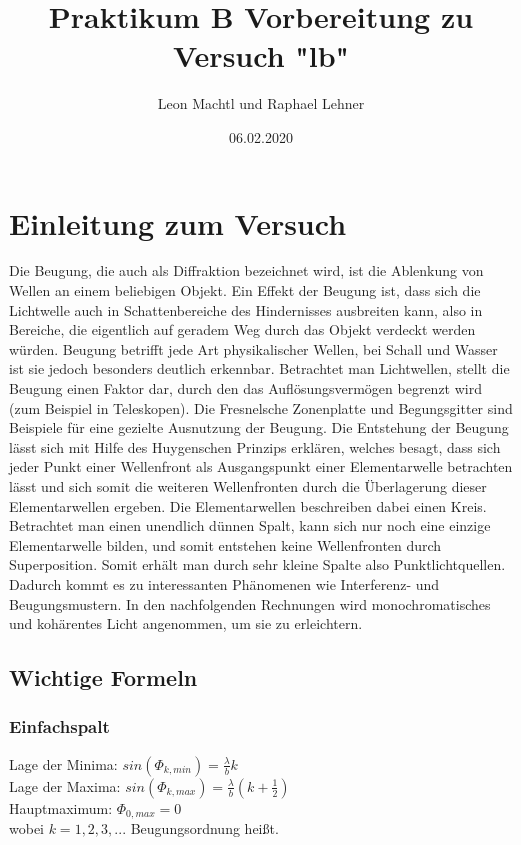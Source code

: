 \documentclass[a4paper,10pt]{scrartcl}
\title{Praktikum B Vorbereitung zu Versuch "lb"}
\author{Leon Machtl und Raphael Lehner}
\date{06.02.2020}
\begin{document}
	\maketitle
	\tableofcontents
	\newpage
	
	\section{Einleitung zum Versuch}
	
	Die Beugung, die auch als Diffraktion bezeichnet wird, ist die Ablenkung von Wellen an einem beliebigen Objekt. Ein Effekt der Beugung ist, dass sich die Lichtwelle auch in Schattenbereiche des Hindernisses ausbreiten kann, also in Bereiche, die eigentlich auf geradem Weg durch das Objekt verdeckt werden würden. Beugung betrifft jede Art physikalischer Wellen, bei Schall und Wasser ist sie jedoch besonders deutlich erkennbar. Betrachtet man Lichtwellen, stellt die Beugung einen Faktor dar, durch den das Auflösungsvermögen begrenzt wird (zum Beispiel in Teleskopen). Die Fresnelsche Zonenplatte und Begungsgitter sind Beispiele für eine gezielte Ausnutzung der Beugung. Die Entstehung der Beugung lässt sich mit Hilfe des Huygenschen Prinzips erklären, welches besagt, dass sich jeder Punkt einer Wellenfront als Ausgangspunkt einer Elementarwelle betrachten lässt und sich somit die weiteren Wellenfronten durch die Überlagerung dieser Elementarwellen ergeben. Die Elementarwellen beschreiben dabei einen Kreis. Betrachtet man einen unendlich dünnen Spalt, kann sich nur noch eine einzige Elementarwelle bilden, und somit entstehen keine Wellenfronten durch Superposition. Somit erhält man durch sehr kleine Spalte also Punktlichtquellen. Dadurch kommt es zu interessanten Phänomenen wie Interferenz- und Beugungsmustern. In den nachfolgenden Rechnungen wird monochromatisches und kohärentes Licht angenommen, um sie zu erleichtern.
	
	\subsection{Wichtige Formeln}
		\subsubsection{Einfachspalt}
			Lage der Minima: \(sin(\Phi_{k,min})=\frac{\lambda}{b}k\) \\
			Lage der Maxima: \(sin(\Phi_{k,max})=\frac{\lambda}{b}(k+\frac{1}{2})\)\\
			Hauptmaximum: \(\Phi_{0,max}=0\)\\
			wobei \(k=1,2,3,...\) Beugungsordnung heißt.
			
\end{document}
